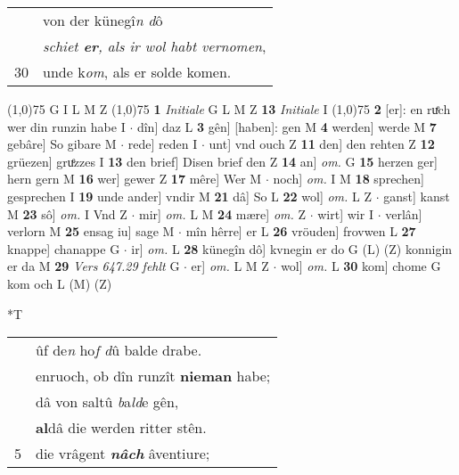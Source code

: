 \documentclass[8pt,a4paper,notitlepage]{article}
\begin{document}
\begin{table}[ht]
\begin{minipage}[t]{0.5\linewidth}
\begin{tabular}{rl}
 & von der künegî\textit{n d}ô\\ 
 & \textit{schiet \textbf{er}, als ir wol habt vernomen},\\ 
30 & unde k\textit{om}, als er solde komen.\\ 
\end{tabular}
\scriptsize
\line(1,0){75} \newline
G I L M Z \newline
\line(1,0){75} \newline
\textbf{1} \textit{Initiale} G L M Z  \textbf{13} \textit{Initiale} I  \newline
\line(1,0){75} \newline
\textbf{2} [er]: en ruͤch wer din runzin habe I  $\cdot$ dîn] daz L \textbf{3} gên] [haben]: gen M \textbf{4} werden] werde M \textbf{7} gebâre] So gibare M  $\cdot$ rede] reden I  $\cdot$ unt] vnd ouch Z \textbf{11} den] den rehten Z \textbf{12} grüezen] gruͤzzes I \textbf{13} den brief] Disen brief den Z \textbf{14} an] \textit{om.} G \textbf{15} herzen ger] hern gern M \textbf{16} wer] gewer Z \textbf{17} mêre] Wer M  $\cdot$ noch] \textit{om.} I M \textbf{18} sprechen] gesprechen I \textbf{19} unde ander] vndir M \textbf{21} dâ] So L \textbf{22} wol] \textit{om.} L Z  $\cdot$ ganst] kanst M \textbf{23} sô] \textit{om.} I Vnd Z  $\cdot$ mir] \textit{om.} L M \textbf{24} mære] \textit{om.} Z  $\cdot$ wirt] wir I  $\cdot$ verlân] verlorn M \textbf{25} ensag iu] sage M  $\cdot$ mîn hêrre] er L \textbf{26} vröuden] frovwen L \textbf{27} knappe] chanappe G  $\cdot$ ir] \textit{om.} L \textbf{28} künegîn dô] kvnegin er do G (L) (Z) konnigin er da M \textbf{29} \textit{Vers 647.29 fehlt} G   $\cdot$ er] \textit{om.} L M Z  $\cdot$ wol] \textit{om.} L \textbf{30} kom] chome G kom och L (M) (Z) \newline
\end{minipage}
\hspace{0.5cm}
\begin{minipage}[t]{0.5\linewidth}
\small
\begin{center}*T
\end{center}
\begin{tabular}{rl}
 & ûf de\textit{n} ho\textit{f d}û balde drabe.\\ 
 & enruoch, ob dîn runzît \textbf{nieman} habe;\\ 
 & dâ von saltû \textit{b}a\textit{ld}e gên,\\ 
 & \textbf{al}dâ die werden ritter stên.\\ 
5 & die vrâgent \textit{\textbf{nâch}} âventiure;\\ 

\end{tabular}
\end{minipage}
\end{table}
\end{document}
